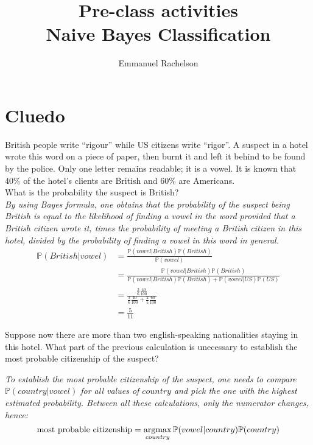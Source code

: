 \documentclass{article}
\author{Emmanuel Rachelson}
\title{Pre-class activities\\Naive Bayes Classification}
\date{}
\newcommand{\argmax}{\operatornamewithlimits{argmax}}
\begin{document}
\maketitle

\section{Cluedo}

British people write ``rigour'' while US citizens write ``rigor''. A suspect in a hotel wrote this word on a piece of paper, then burnt it and left it behind to be found by the police. Only one letter remains readable; it is a vowel. It is known that 40\% of the hotel's clients are British and 60\% are Americans.\\
\noindent {} What is the probability the suspect is British?\\

{\it By using Bayes formula, one obtains that the probability of the suspect being British is equal to the likelihood of finding a vowel in the word provided that a British citizen wrote it, times the probability of meeting a British citizen in this hotel, divided by the probability of finding a vowel in this word in general.
\begin{align*}
\mathbb{P}(British | vowel) & = \frac{\mathbb{P}(vowel | British) \mathbb{P}(British)}{\mathbb{P}(vowel)}\\
& = \frac{\mathbb{P}(vowel | British) \mathbb{P}(British)}{\mathbb{P}(vowel | British) \mathbb{P}(British) + \mathbb{P}(vowel | US) \mathbb{P}(US)}\\
& = \frac{ \frac{3}{6} \frac{40}{100} }{ \frac{3}{6} \frac{40}{100} + \frac{2}{5} \frac{60}{100} }\\
& = \frac{5}{11}
\end{align*}
}

\noindent {} Suppose now there are more than two english-speaking nationalities staying in this hotel. What part of the previous calculation is unecessary to establish the most probable citizenship of the suspect?

{\it To establish the most probable citizenship of the suspect, one needs to compare $\mathbb{P}(country | vowel)$ for all values of $country$ and pick the one with the highest estimated probability. Between all these calculations, only the numerator changes, hence:
\begin{equation*}
\text{most probable citizenship} = \argmax_{country} \mathbb{P}(vowel | country) \mathbb{P}(country)
\end{equation*}
}
\end{document}

